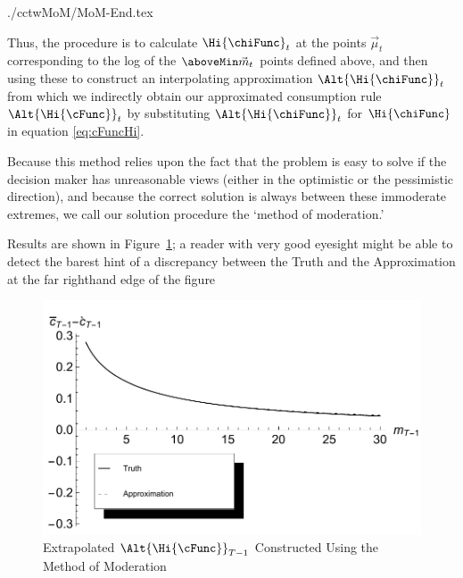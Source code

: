 \documentclass[titlepage, headings=optiontotocandhead]{\econtex}
\begin{document}
\begin{verbatimwrite}{./cctwMoM/MoM-End.tex}

  Thus, the procedure is to calculate $\Hi{\chiFunc}_{t}$ at the points
  $\vec{\mu}_{t}$ corresponding to the log of the $\aboveMin
  \vec{m}_{t}$ points defined above, and then using these to construct an
  interpolating approximation $\Alt{\Hi{\chiFunc}}_{t}$ from which we indirectly obtain our 
  approximated consumption rule $\Alt{\Hi{\cFunc}}_{t}$ by substituting $\Alt{\Hi{\chiFunc}}_{t}$ for $\Hi{\chiFunc}$ in equation \eqref{eq:cFuncHi}.

  Because this method relies upon the fact that the problem is easy to
  solve if the decision maker has unreasonable views (either in the
  optimistic or the pessimistic direction), and because the correct
  solution is always between these immoderate extremes, we call our 
  solution procedure the `method of moderation.'

  Results are shown in Figure~\ref{fig:ExtrapProblemSolved}; a reader
  with very good eyesight might be able to detect the barest hint of a
  discrepancy between the Truth and the Approximation at the far
  righthand edge of the figure
  \hypertarget{ExtrapProblemSolvedPlot}{}
  \begin{figure}
    \includegraphics{./Figures/ExtrapProblemSolvedPlot}
    \caption{Extrapolated $\Alt{\Hi{\cFunc}}_{T-1}$ Constructed Using the Method of Moderation}
    \label{fig:ExtrapProblemSolved}
  \end{figure}
\end{verbatimwrite}
\unskip

\hypertarget{Approximating-the-Slope-Too}{}
\end{document}
